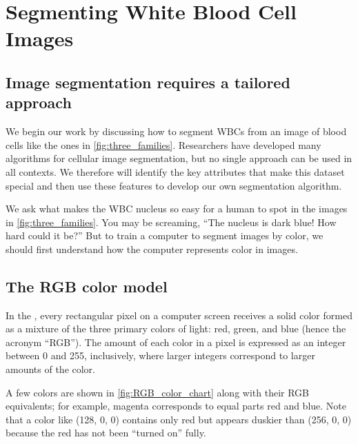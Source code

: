 \FloatBarrier
{}

\section{Segmenting White Blood Cell Images}
\label{sec:segmenting_white_blood_cell_images}
\subsection{Image segmentation requires a tailored approach}

We begin our work by discussing how to segment WBCs from an image of blood cells like the ones in \autoref{fig:three_families}. Researchers have developed many algorithms for cellular image segmentation, but no single approach can be used in all contexts. We therefore will identify the key attributes that make this dataset special and then use these features to develop our own segmentation algorithm.

We ask what makes the WBC nucleus so easy for a human to spot in the images in \autoref{fig:three_families}. You may be screaming, ``The nucleus is dark blue! How hard could it be?'' But to train a computer to segment images by color, we should first understand how the computer represents color in images.

\FloatBarrier
{}
\subsection{The RGB color model}

In the , every rectangular pixel on a computer screen receives a solid color formed as a mixture of the three primary colors of light: red, green, and blue (hence the acronym ``RGB''). The amount of each color in a pixel is expressed as an integer between 0 and 255, inclusively, where larger integers correspond to larger amounts of the color.

A few colors are shown in \autoref{fig:RGB_color_chart} along with their RGB equivalents; for example, magenta corresponds to equal parts red and blue. Note that a color like (128, 0, 0) contains only red but appears duskier than (256, 0, 0) because the red has not been “turned on” fully.

